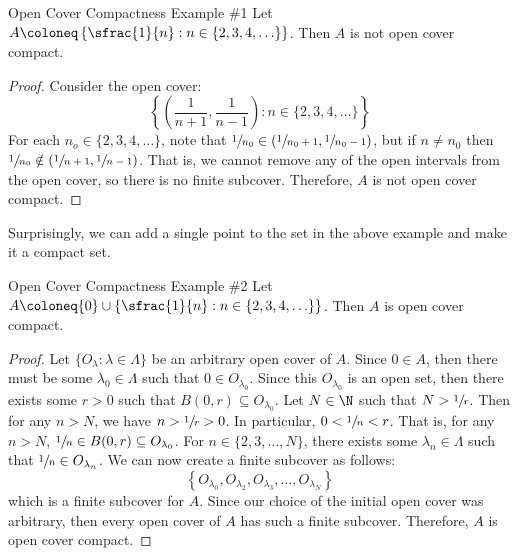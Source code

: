 \begin{exbox}{Open Cover Compactness Example \#1}{}
    Let $A \coloneq \left\{ \sfrac{1}{n} : n \in \{2,3,4,\ldots\} \right\}$. Then $A$ is not open cover compact.
    \tcblower
    \begin{proof}
        Consider the open cover:
        \[ \left\{ \left( \frac{1}{n+1}, \frac{1}{n-1} \right) : n \in \{2,3,4,\ldots\} \right\} \]
        For each $n_o \in \{2,3,4,\ldots\}$, note that $\sfrac{1}{n_0} \in \left( \sfrac{1}{n_0 + 1}, \sfrac{1}{n_0 - 1} \right)$, but if $n \neq n_0$ then $\sfrac{1}{n_0} \notin \left( \sfrac{1}{n+1}, \sfrac{1}{n-1} \right)$. That is, we cannot remove any of the open intervals from the open cover, so there is no finite subcover. Therefore, $A$ is not open cover compact.
    \end{proof}
\end{exbox}

Surprisingly, we can add a single point to the set in the above example and make it a compact set.

\begin{exbox}{Open Cover Compactness Example \#2}{}
    Let $A \coloneq \{0\} \cup \left\{ \sfrac{1}{n} : n \in \{2,3,4,\ldots\} \right\}$. Then $A$ is open cover compact.
    \tcblower
    \begin{proof}
        Let $\{O_\lambda : \lambda \in \Lambda\}$ be an arbitrary open cover of $A$. Since $0 \in A$, then there must be some $\lambda_0 \in \Lambda$ such that $0 \in O_{\lambda_0}$. Since this $O_{\lambda_0}$ is an open set, then there exists some $r > 0$ such that $B(0, r) \subseteq O_{\lambda_0}$. Let $N \in \N$ such that $N > \sfrac{1}{r}$. Then for any $n > N$, we have $n > \sfrac{1}{r} > 0$. In particular, $0 < \sfrac{1}{n} < r$. That is, for any $n > N$, $\sfrac{1}{n} \in B(0,r) \subseteq O_{\lambda_0}$. For $n \in \{2,3,\ldots,N\}$, there exists some $\lambda_n \in \Lambda$ such that $\sfrac{1}{n} \in O_{\lambda_n}$. We can now create a finite subcover as follows:
        \[ \left\{ O_{\lambda_0}, O_{\lambda_2}, O_{\lambda_3}, \ldots, O_{\lambda_N} \right\} \]
        which is a finite subcover for $A$. Since our choice of the initial open cover was arbitrary, then every open cover of $A$ has such a finite subcover. Therefore, $A$ is open cover compact.
    \end{proof}
\end{exbox}

